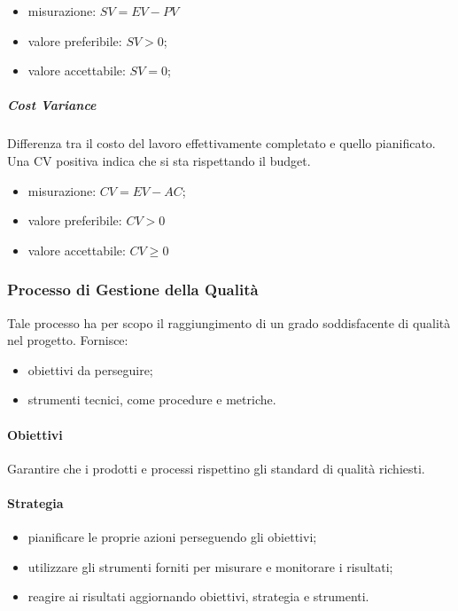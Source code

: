 			\begin{itemize}
				\item misurazione: $SV = EV - PV$
				\item valore preferibile: $SV > 0$;
				\item valore accettabile: $SV = 0$;
			\end{itemize}
			\subparagraph{Cost Variance}
			Differenza tra il costo del lavoro effettivamente completato e quello pianificato. Una CV positiva indica che si sta rispettando il budget.
			\begin{itemize}
				\item misurazione: $CV = EV - AC$;
				\item valore preferibile: $CV > 0$
				\item valore accettabile: $CV \geq 0$
			\end{itemize}
		
	\subsubsection{Processo di Gestione della Qualità}
	Tale processo ha per scopo il raggiungimento di un grado soddisfacente di qualità nel progetto. Fornisce:
	\begin{itemize}
		\item obiettivi da perseguire;
		\item strumenti tecnici, come procedure e metriche.
	\end{itemize}
		\paragraph{Obiettivi}
		Garantire che i prodotti e processi rispettino gli standard di qualità richiesti.
		\paragraph{Strategia}
		\begin{itemize}
			\item pianificare le proprie azioni perseguendo gli obiettivi;
			\item utilizzare gli strumenti forniti per misurare e monitorare i risultati;
			\item reagire ai risultati aggiornando obiettivi, strategia e strumenti.
		\end{itemize}
